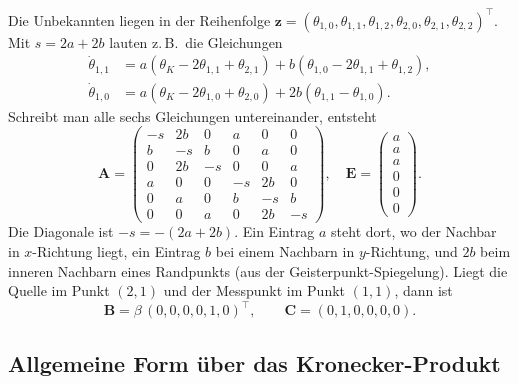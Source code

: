 \documentclass[11pt,a4paper]{article}
\numberwithin{equation}{section}
\newcommand{\thK}{\theta_{K}}
\newcommand{\mA}{\mathbf{A}}
\newcommand{\mB}{\mathbf{B}}
\newcommand{\mE}{\mathbf{E}}
\newcommand{\mC}{\mathbf{C}}
\newcommand{\vz}{\mathbf{z}}
\begin{document}
Die Unbekannten liegen in der Reihenfolge
$\vz=(\theta_{1,0},\theta_{1,1},\theta_{1,2},\theta_{2,0},\theta_{2,1},\theta_{2,2})^\top$. Mit $s=2a+2b$ lauten z.\,B.\ die Gleichungen
\begin{align*}
 \dot\theta_{1,1}&=a(\thK-2\theta_{1,1}+\theta_{2,1})+b(\theta_{1,0}-2\theta_{1,1}+\theta_{1,2}),\\
 \dot\theta_{1,0}&=a(\thK-2\theta_{1,0}+\theta_{2,0})+2b(\theta_{1,1}-\theta_{1,0}).
\end{align*}
Schreibt man alle sechs Gleichungen untereinander, entsteht
\begin{equation}
 \mA=\begin{pmatrix}
 -s&2b&0&a&0&0\\
 b&-s&b&0&a&0\\
 0&2b&-s&0&0&a\\
 a&0&0&-s&2b&0\\
 0&a&0&b&-s&b\\
 0&0&a&0&2b&-s
 \end{pmatrix},\quad
 \mE=\begin{pmatrix}a\\a\\a\\0\\0\\0\end{pmatrix}.
 \label{eq:A6}
\end{equation}
Die Diagonale ist $-s=-(2a+2b)$. Ein Eintrag $a$ steht dort, wo der Nachbar in $x$-Richtung liegt, ein Eintrag $b$ bei einem Nachbarn in $y$-Richtung, und $2b$ beim inneren Nachbarn eines Randpunkts (aus der Geisterpunkt-Spiegelung). Liegt die Quelle im Punkt $(2,1)$ und der Messpunkt im Punkt $(1,1)$, dann ist
\begin{equation}
 \mB=\beta\,(0,0,0,0,1,0)^\top,\qquad \mC=(0,1,0,0,0,0).
\end{equation}

\subsection{Allgemeine Form über das Kronecker-Produkt}
\end{document}

